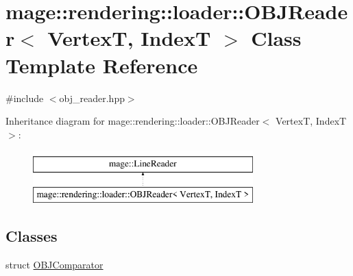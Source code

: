 \hypertarget{classmage_1_1rendering_1_1loader_1_1_o_b_j_reader}{}\section{mage\+:\+:rendering\+:\+:loader\+:\+:O\+B\+J\+Reader$<$ VertexT, IndexT $>$ Class Template Reference}
\label{classmage_1_1rendering_1_1loader_1_1_o_b_j_reader}


{\ttfamily \#include $<$obj\+\_\+reader.\+hpp$>$}

Inheritance diagram for mage\+:\+:rendering\+:\+:loader\+:\+:O\+B\+J\+Reader$<$ VertexT, IndexT $>$\+:\begin{figure}[H]
\begin{center}
\leavevmode
\includegraphics[height=2.000000cm]{classmage_1_1rendering_1_1loader_1_1_o_b_j_reader}
\end{center}
\end{figure}
\subsection*{Classes}
\begin{DoxyCompactItemize}
\item 
struct \mbox{\hyperlink{structmage_1_1rendering_1_1loader_1_1_o_b_j_reader_1_1_o_b_j_comparator}{O\+B\+J\+Comparator}}
\end{DoxyCompactItemize}

